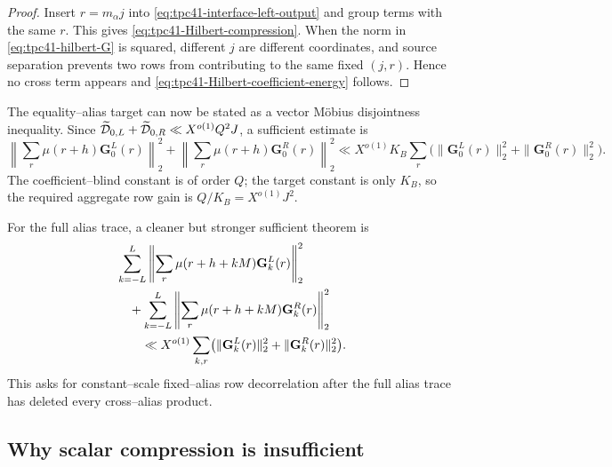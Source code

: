 \begin{proof}
Insert \(r=m_\alpha j\) into
\eqref{eq:tpc41-interface-left-output} and group terms with the same
\(r\).  This gives \eqref{eq:tpc41-Hilbert-compression}.  When the norm in
\eqref{eq:tpc41-hilbert-G} is squared, different \(j\) are different
coordinates, and source separation prevents two rows from contributing to
the same fixed \((j,r)\).  Hence no cross term appears and
\eqref{eq:tpc41-Hilbert-coefficient-energy} follows.
\end{proof}

The equality--alias target can now be stated as a vector M\"obius
disjointness inequality.  Since
\(\widetilde{\mathcal D}_{0,L}+\widetilde{\mathcal D}_{0,R}\ll X^{o(1)}Q^2J\), a
sufficient estimate is
\begin{equation}
 \left\|\sum_r\mu(r+h)\mathbf G_0^L(r)\right\|_2^2
 +\left\|\sum_r\mu(r+h)\mathbf G_0^R(r)\right\|_2^2
 \ll X^{o(1)}K_B
 \sum_r\bigl(
 \|\mathbf G_0^L(r)\|_2^2+
 \|\mathbf G_0^R(r)\|_2^2\bigr).
 \label{eq:tpc41-Hilbert-equality-target}
\end{equation}
The coefficient--blind constant is of order \(Q\); the target constant is
only \(K_B\), so the required aggregate row gain is
\(Q/K_B=X^{o(1)}J^2\).

For the full alias trace, a cleaner but stronger sufficient theorem is
\begin{align}
 &\sum_{k=-L}^{L}
 \left\|\sum_r\mu(r+h+kM)\mathbf G_k^L(r)\right\|_2^2
 \notag\\
 &\quad+
 \sum_{k=-L}^{L}
 \left\|\sum_r\mu(r+h+kM)\mathbf G_k^R(r)\right\|_2^2
 \notag\\
 &\qquad\ll X^{o(1)}
 \sum_{k,r}\bigl(
 \|\mathbf G_k^L(r)\|_2^2+
 \|\mathbf G_k^R(r)\|_2^2\bigr).
 \label{eq:tpc41-Hilbert-trace-target}
\end{align}
This asks for constant--scale fixed--alias row decorrelation after the
full alias trace has deleted every cross--alias product.

\subsection{Why scalar compression is insufficient}

